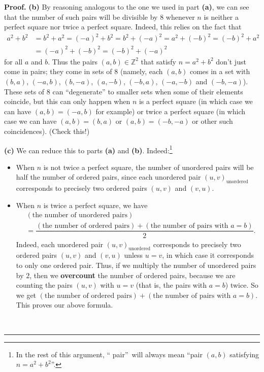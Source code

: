 \documentclass[numbers=enddot,12pt,final,onecolumn,notitlepage]{scrartcl}%
\numberwithin{exer}{section}
\theoremstyle{definition}
\newenvironment{proof}[1][Proof]{\noindent\textbf{#1.} }{\ \rule{0.5em}{0.5em}}
\begin{document}
\begin{proof}
\textbf{(b)} By reasoning analogous to the one we used in part \textbf{(a)},
we can see that the number of such pairs will be divisible by $8$ whenever $n$
is neither a perfect square nor twice a perfect square. Indeed, this relies on
the fact that
\begin{align*}
a^{2} + b^{2}  &  = b^{2} + a^{2} = \left(  -a \right)  ^{2} + b^{2} = b^{2} +
\left(  -a \right)  ^{2} = a^{2} + \left(  -b \right)  ^{2} = \left(  -b
\right)  ^{2} + a^{2}\\
&  = \left(  -a \right)  ^{2} + \left(  -b \right)  ^{2} = \left(  -b \right)
^{2} + \left(  -a \right)  ^{2}%
\end{align*}
for all $a$ and $b$. Thus the pairs $\left(  a, b \right)  \in\mathbb{Z}^{2}$
that satisfy $n = a^{2} + b^{2}$ don't just come in pairs; they come in sets
of $8$ (namely, each $\left(  a, b \right)  $ comes in a set with $\left(  b,
a \right)  $, $\left(  -a, b \right)  $, $\left(  b, -a \right)  $, $\left(
a, -b \right)  $, $\left(  -b, a \right)  $, $\left(  -a, -b \right)  $ and
$\left(  -b, -a \right)  $). These sets of $8$ can ``degenerate'' to smaller
sets when some of their elements coincide, but this can only happen when $n$
is a perfect square (in which case we can have $\left(  a, b \right)  =
\left(  -a, b \right)  $ for example) or twice a perfect square (in which case
we can have $\left(  a, b \right)  = \left(  b, a \right)  $ or $\left(  a, b
\right)  = \left(  -b, -a \right)  $ or other such coincidences). (Check this!)

\textbf{(c)} We can reduce this to parts \textbf{(a)} and \textbf{(b)}.
Indeed:\footnote{In the rest of this argument, \textquotedblleft
pair\textquotedblright\ will always mean \textquotedblleft pair $\left(
a,b\right)  $ satisfying $n=a^{2}+b^{2}$\textquotedblright.}

\begin{itemize}
\item When $n$ is not twice a perfect square, the number of unordered pairs
will be half the number of ordered pairs, since each unordered pair $\left(
u,v\right)  _{\text{unordered}}$ corresponds to precisely two ordered pairs
$\left(  u,v\right)  $ and $\left(  v,u\right)  $.

\item When $n$ is twice a perfect square, we have%
\begin{align*}
&  \left(  \text{the number of unordered pairs}\right) \\
&  =\dfrac{\left(  \text{the number of ordered pairs}\right)  +\left(
\text{the number of pairs with }a=b\right)  }{2}.
\end{align*}
Indeed, each unordered pair $\left(  u,v\right)  _{\text{unordered}}$
corresponds to precisely two ordered pairs $\left(  u,v\right)  $ and $\left(
v,u\right)  $ unless $u=v$, in which case it corresponds to only one ordered
pair. Thus, if we multiply the number of unordered pairs by $2$, then we
\textbf{overcount} the number of ordered pairs, because we are counting the
pairs $\left(  u,v\right)  $ with $u=v$ (that is, the pairs with $a=b$) twice.
So we get $\left(  \text{the number of ordered pairs}\right)  +\left(
\text{the number of pairs with }a=b\right)  $. This proves our above formula.


\end{itemize}
\end{proof}
\end{document}
